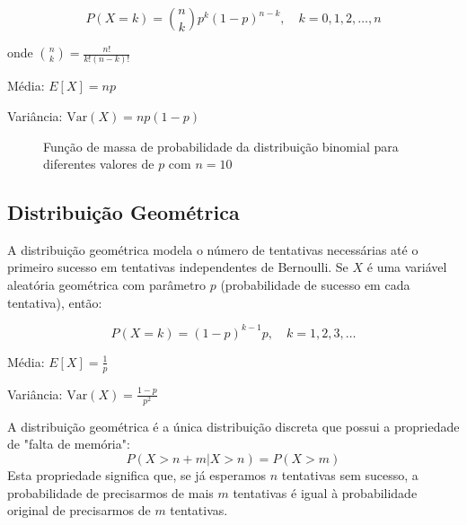 \documentclass[a4paper,12pt]{article}
\begin{document}
\begin{equation}
P(X = k) = \binom{n}{k} p^k (1-p)^{n-k}, \quad k = 0, 1, 2, \ldots, n
\end{equation}

onde $\binom{n}{k} = \frac{n!}{k!(n-k)!}$

Média: $E[X] = np$

Variância: $\text{Var}(X) = np(1-p)$

\begin{figure}[H]
\centering
{}
\caption{Função de massa de probabilidade da distribuição binomial para diferentes valores de $p$ com $n=10$}
\end{figure}

\subsection{Distribuição Geométrica}

A distribuição geométrica modela o número de tentativas necessárias até o primeiro sucesso em tentativas independentes de Bernoulli. Se $X$ é uma variável aleatória geométrica com parâmetro $p$ (probabilidade de sucesso em cada tentativa), então:

\begin{equation}
P(X = k) = (1-p)^{k-1} p, \quad k = 1, 2, 3, \ldots
\end{equation}

Média: $E[X] = \frac{1}{p}$

Variância: $\text{Var}(X) = \frac{1-p}{p^2}$

\begin{tcolorbox}[colback=green!5, colframe=green!40, title=\textbf{Propriedade de "Falta de Memória"}]
A distribuição geométrica é a única distribuição discreta que possui a propriedade de "falta de memória":
\begin{equation}
P(X > n+m | X > n) = P(X > m)
\end{equation}
Esta propriedade significa que, se já esperamos $n$ tentativas sem sucesso, a probabilidade de precisarmos de mais $m$ tentativas é igual à probabilidade original de precisarmos de $m$ tentativas.
\end{tcolorbox}
\end{document}
